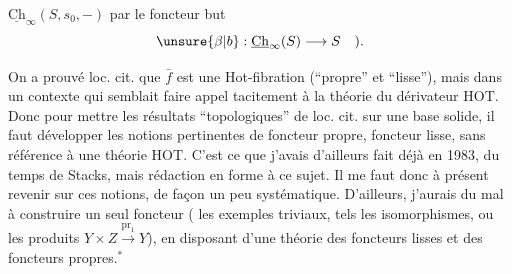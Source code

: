 
$\underline{\mathrm{Ch}}_{\infty}(S,s_0,-)$ par le foncteur but
\[
\unsure{\beta|b}:\underline{\mathrm{Ch}}_{\infty}(S)\longrightarrow S\quad).
\]

On a prouvé  loc. cit. que $\bar f$ est une
Hot-fibration (``propre'' et ``lisse''), mais dans un
contexte qui semblait faire appel tacitement à
la théorie du dérivateur $\mathrm{HOT}$. Donc pour
mettre les résultats ``topologiques'' de loc. cit.
sur une base solide, il faut développer les
notions pertinentes de foncteur propre, foncteur
lisse, sans référence à une théorie $\mathrm{HOT}$. C'est
ce que j'avais d'ailleurs fait déjà 
en 1983, du temps de  Stacks,
mais  rédaction en forme à ce sujet. Il
me faut donc à présent revenir sur ces
notions, de façon un peu systématique. D'ailleurs,
j'aurais du mal à construire un seul foncteur
 (  les exemples triviaux,
tels les isomorphismes\deleted{\unsure{)}}, ou les produits $Y\times Z\xrightarrow{\mathrm{pr}_1}Y$),
en disposant d'une théorie des
foncteurs lisses et des foncteurs propres.$^{*}$

